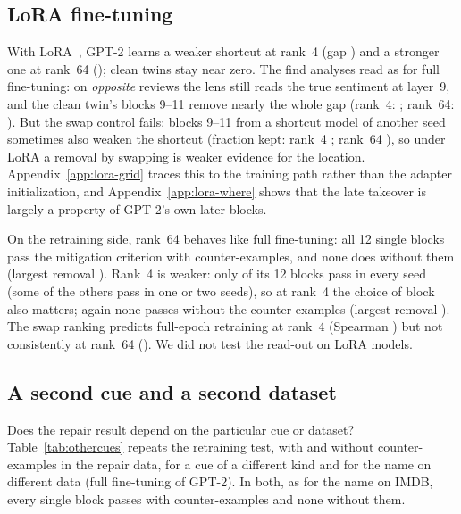 \subsection{LoRA fine-tuning}
\label{sec:lora}
With LoRA~\cite{hu2022lora}, GPT-2 learns a weaker shortcut at rank~4 (gap \gapLoraRFourRange) and a stronger one at
rank~64 (\gapLoraRSixtyFourRange); clean twins stay near zero. The find analyses read as for full fine-tuning: on
\emph{opposite} reviews the lens still reads the true sentiment at layer~9, and the clean twin's blocks 9--11 remove
nearly the whole gap (rank~4: \swapARemovedLateLoraRFourRange; rank~64: \swapARemovedLateLoraRSixtyFourRange). But the
swap control fails: blocks 9--11 from a shortcut model of another seed sometimes also weaken the shortcut (fraction kept:
rank~4 \swapCiiKeptLateLoraRFourRange; rank~64 \swapCiiKeptLateLoraRSixtyFourRange), so under LoRA a removal by swapping
is weaker evidence for the location. Appendix~\ref{app:lora-grid} traces this to the training path rather than the
adapter initialization, and Appendix~\ref{app:lora-where} shows that the late takeover is largely a property of GPT-2's
own later blocks.

On the retraining side, rank~64 behaves like full fine-tuning: all 12 single blocks pass the mitigation criterion with
counter-examples, and none does without them (largest removal \ccNoNamesMaxLoraRSixtyFour). Rank~4 is weaker: only
\ccPassWithNamesLoraRFour{} of its 12 blocks pass in every seed (some of the others pass in one or two seeds), so at
rank~4 the choice of block also matters; again none passes without the counter-examples (largest removal
\ccNoNamesMaxLoraRFour). The swap ranking predicts full-epoch retraining at rank~4 (Spearman
\spearmanSwapRetrainLoraRFourRange) but not consistently at rank~64 (\spearmanSwapRetrainLoraRSixtyFourRange). We did not
test the read-out on LoRA models.

\subsection{A second cue and a second dataset}
\label{sec:othercues}
Does the repair result depend on the particular cue or dataset? Table~\ref{tab:othercues} repeats the retraining test,
with and without counter-examples in the repair data, for a cue of a different kind and for the name on different data
(full fine-tuning of GPT-2). In both, as for the name on IMDB, every single block passes with counter-examples and none
without them.

